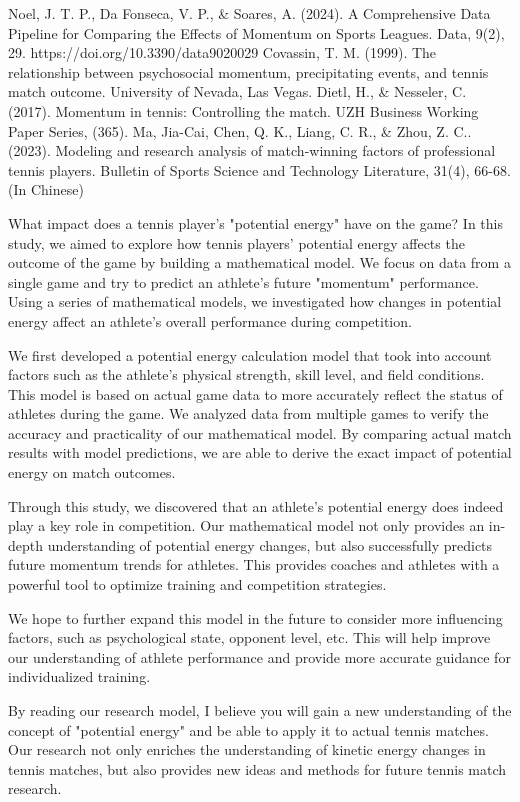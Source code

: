 \documentclass{mcmthesis}
\begin{document}
\begin{thebibliography}{99}

     Noel, J. T. P., Da Fonseca, V. P., \& Soares, A. (2024). A Comprehensive Data Pipeline for Comparing the Effects of Momentum on Sports Leagues. Data, 9(2), 29. https://doi.org/10.3390/data9020029
     Covassin, T. M. (1999). The relationship between psychosocial momentum, precipitating events, and tennis match outcome. University of Nevada, Las Vegas.
     Dietl, H., \& Nesseler, C. (2017). Momentum in tennis: Controlling the match. UZH Business Working Paper Series, (365).
     Ma, Jia-Cai, Chen, Q. K., Liang, C. R., \& Zhou, Z. C.. (2023). Modeling and research analysis of match-winning factors of professional tennis players. Bulletin of Sports Science and Technology Literature, 31(4), 66-68.(In Chinese)

\end{thebibliography}

\newpage

\begin{letter}{What impact does a tennis player's "potential energy" have on the game?}
    In this study, we aimed to explore how tennis players' potential energy affects the outcome of the game by building a mathematical model. We focus on data from a single game and try to predict an athlete's future "momentum" performance. Using a series of mathematical models, we investigated how changes in potential energy affect an athlete's overall performance during competition.

    We first developed a potential energy calculation model that took into account factors such as the athlete's physical strength, skill level, and field conditions. This model is based on actual game data to more accurately reflect the status of athletes during the game. We analyzed data from multiple games to verify the accuracy and practicality of our mathematical model. By comparing actual match results with model predictions, we are able to derive the exact impact of potential energy on match outcomes.

    Through this study, we discovered that an athlete's potential energy does indeed play a key role in competition. Our mathematical model not only provides an in-depth understanding of potential energy changes, but also successfully predicts future momentum trends for athletes. This provides coaches and athletes with a powerful tool to optimize training and competition strategies.

    We hope to further expand this model in the future to consider more influencing factors, such as psychological state, opponent level, etc. This will help improve our understanding of athlete performance and provide more accurate guidance for individualized training.

    By reading our research model, I believe you will gain a new understanding of the concept of "potential energy" and be able to apply it to actual tennis matches. Our research not only enriches the understanding of kinetic energy changes in tennis matches, but also provides new ideas and methods for future tennis match research.
\end{letter}
\end{document}
